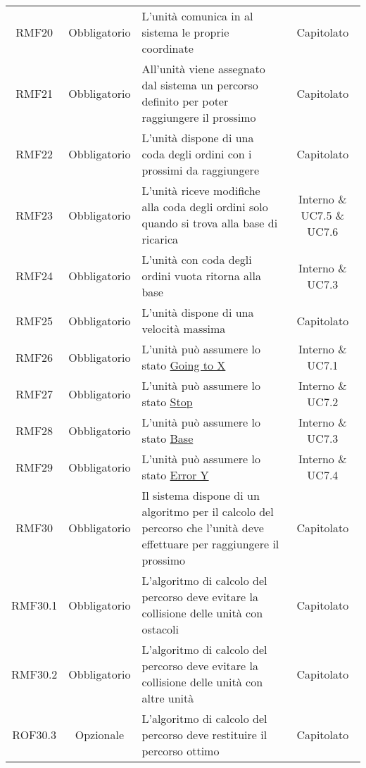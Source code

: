 \begin{longtable}[h!] { c c m{8cm} c}
		RMF20 & Obbligatorio & L'unità comunica in \glock{real-time} al sistema le proprie coordinate & Capitolato \\

		RMF21 & Obbligatorio & All'unità viene assegnato dal sistema un percorso definito per poter raggiungere il prossimo \glock{POI} & Capitolato \\

		RMF22 & Obbligatorio & L'unità dispone di una coda degli ordini con i prossimi \glock{POI} da raggiungere & Capitolato \\

		RMF23 & Obbligatorio & L'unità riceve modifiche alla coda degli ordini solo quando si trova alla base di ricarica & Interno \& UC7.5 \& UC7.6 \\

		RMF24 & Obbligatorio & L'unità con coda degli ordini vuota ritorna alla base & Interno \& UC7.3 \\

		RMF25 & Obbligatorio & L'unità dispone di una velocità massima & Capitolato \\

		RMF26 & Obbligatorio & L'unità può assumere lo stato \underline{Going to X} & Interno \& UC7.1 \\

		RMF27 & Obbligatorio & L'unità può assumere lo stato \underline{Stop} & Interno \& UC7.2 \\

		RMF28 & Obbligatorio & L'unità può assumere lo stato \underline{Base} & Interno \& UC7.3 \\

		RMF29 & Obbligatorio & L'unità può assumere lo stato \underline{Error Y} & Interno \& UC7.4 \\

		RMF30 & Obbligatorio & Il sistema dispone di un algoritmo per il calcolo del percorso che l'unità deve effettuare per raggiungere il prossimo \glock{POI} & Capitolato \\

		RMF30.1 & Obbligatorio & L'algoritmo di calcolo del percorso deve evitare la collisione delle unità con ostacoli & Capitolato \\

		RMF30.2 & Obbligatorio & L'algoritmo di calcolo del percorso deve evitare la collisione delle unità con altre unità & Capitolato \\

		ROF30.3 & Opzionale & L'algoritmo di calcolo del percorso deve restituire il percorso ottimo & Capitolato \\


\end{longtable}
